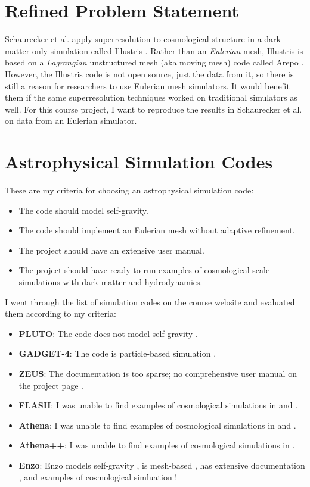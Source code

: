 \section*{Refined Problem Statement}

Schaurecker et al. \cite{superresolving-halos} apply superresolution to cosmological structure in a dark matter only simulation called Illustris \cite{Illustris}. Rather than an \textit{Eulerian} mesh, Illustris is based on a \textit{Lagrangian} unstructured mesh (aka moving mesh) code called Arepo \cite{Arepo}. However, the Illustris code is not open source, just the data from it, so there is still a reason for researchers to use Eulerian mesh simulators. It would benefit them if the same superresolution techniques worked on traditional simulators as well. For this course project, I want to reproduce the results in Schaurecker et al. on data from an Eulerian simulator.

\section*{Astrophysical Simulation Codes}

These are my criteria for choosing an astrophysical simulation code:

\begin{itemize}
\item The code should model self-gravity.
\item The code should implement an Eulerian mesh without adaptive refinement.
\item The project should have an extensive user manual.
\item The project should have ready-to-run examples of cosmological-scale simulations with dark matter and hydrodynamics.
\end{itemize}

I went through the list of simulation codes on the course website and evaluated them according to my criteria:

\begin{itemize}
\item \textbf{PLUTO}: The code does not model self-gravity \cite{PLUTO-paper}.
\item \textbf{GADGET-4}: The code is particle-based simulation \cite{GADGET-paper}.
\item \textbf{ZEUS}: The documentation is too sparse; no comprehensive user manual on the project page \cite{ZEUS-homepage}.
\item \textbf{FLASH}: I was unable to find examples of cosmological simulations in \cite{FLASH-gallery} and \cite{FLASH-userguide}.
\item \textbf{Athena}: I was unable to find examples of cosmological simulations in \cite{Athena-gallery} and \cite{Athena-userguide}.
\item \textbf{Athena++}: I was unable to find examples of cosmological simulations in \cite{Athenapp-userguide}.
\item \textbf{Enzo}: Enzo models self-gravity \cite{Enzo-paper}, is mesh-based \cite{Enzo-paper}, has extensive documentation \cite{Enzo-userguide}, and examples of cosmological simluation \cite{Enzo-examples}!
\end{itemize}

